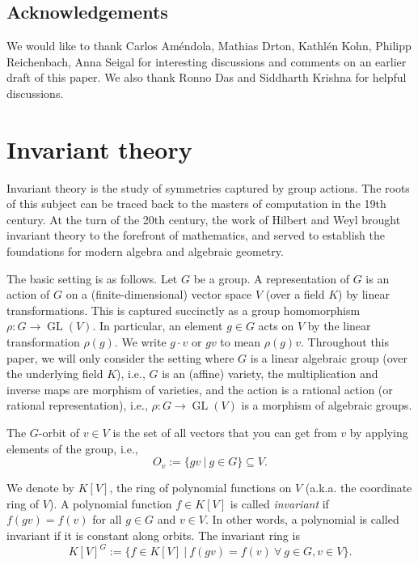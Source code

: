 \documentclass[11pt]{amsart}
\theoremstyle{definition}
\newcommand{\GL}{\operatorname{GL}}
\begin{document}
\subsection{Acknowledgements}
We would like to thank Carlos Am\'endola, Mathias Drton, Kathl\'en Kohn, Philipp Reichenbach, Anna Seigal for interesting discussions and comments on an earlier draft of this paper.  We also thank Ronno Das and Siddharth Krishna for helpful discussions.






\section{Invariant theory} \label{sec:inv.thry}
Invariant theory is the study of symmetries captured by group actions. The roots of this subject can be traced back to the masters of computation in the 19th century. At the turn of the 20th century, the work of Hilbert and Weyl brought invariant theory to the forefront of mathematics, and served to establish the foundations for modern algebra and algebraic geometry. 

The basic setting is as follows. Let $G$ be a group. A representation of $G$ is an action of $G$ on a (finite-dimensional) vector space $V$ (over a field $K$) by linear transformations. This is captured succinctly as a group homomorphism $\rho: G \rightarrow \GL(V)$. In particular, an element $g \in G$ acts on $V$ by the linear transformation $\rho(g)$. We write $g \cdot v$ or $gv$ to mean $\rho(g)v$. Throughout this paper, we will only consider the setting where $G$ is a linear algebraic group (over the underlying field $K$), i.e., $G$ is an (affine) variety, the multiplication and inverse maps are morphism of varieties, and the action is a rational action (or rational representation), i.e., $\rho: G \rightarrow \GL(V)$ is a morphism of algebraic groups.

The $G$-orbit of $v \in V$ is the set of all vectors that you can get from $v$ by applying elements of the group, i.e., 
$$
O_v := \{gv\ |\ g \in G\} \subseteq V.
$$

We denote by $K[V]$, the ring of polynomial functions on $V$ (a.k.a. the coordinate ring of $V$). A polynomial function $f \in K[V]$ is called {\em invariant} if $f(gv) = f(v)$ for all $g \in G$ and $v \in V$. In other words, a polynomial is called invariant if it is constant along orbits. The invariant ring is 
$$
K[V]^G := \{f \in K[V]\ |\ f(gv) = f(v) \ \forall\ g \in G, v \in V\}.
$$
\end{document}
